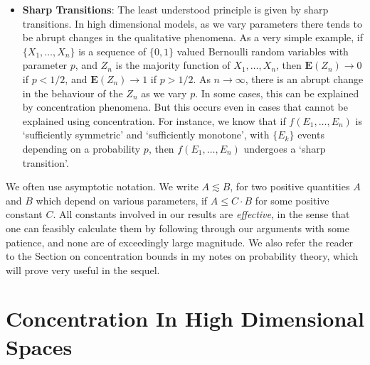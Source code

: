 \begin{itemize}
    \item[] \textbf{Sharp Transitions}: The least understood principle is given by sharp transitions. In high dimensional models, as we vary parameters there tends to be abrupt changes in the qualitative phenomena. As a very simple example, if $\{ X_1, \dots, X_n \}$ is a sequence of $\{ 0, 1 \}$ valued Bernoulli random variables with parameter $p$, and $Z_n$ is the majority function of $X_1, \dots, X_n$, then $\mathbf{E}(Z_n) \to 0$ if $p < 1/2$, and $\mathbf{E}(Z_n) \to 1$ if $p > 1/2$. As $n \to \infty$, there is an abrupt change in the behaviour of the $Z_n$ as we vary $p$. In some cases, this can be explained by concentration phenomena. But this occurs even in cases that cannot be explained using concentration. For instance, we know that if $f(E_1, \dots, E_n)$ is `sufficiently symmetric' and `sufficiently monotone', with $\{ E_k \}$ events depending on a probability $p$, then $f(E_1, \dots, E_n)$ undergoes a `sharp transition'.
\end{itemize}

We often use asymptotic notation. We write $A \lesssim B$, for two positive quantities $A$ and $B$ which depend on various parameters, if $A \leq C \cdot B$ for some positive constant $C$. All constants involved in our results are {\it effective}, in the sense that one can feasibly calculate them by following through our arguments with some patience, and none are of exceedingly large magnitude. We also refer the reader to the Section on concentration bounds in my notes on probability theory, which will prove very useful in the sequel.
























\chapter{Concentration In High Dimensional Spaces}

